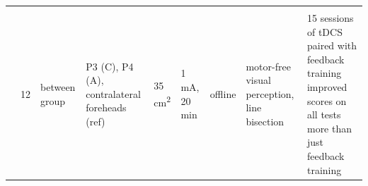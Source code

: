\documentclass[11pt,english,]{memoir}
\begin{document}
\begin{longtable}[]{@{}lllllllll@{}}
\begin{minipage}[t]{0.04\columnwidth}
\strut
\end{minipage} & \begin{minipage}[t]{0.10\columnwidth}\raggedright
\strut
\end{minipage} & \begin{minipage}[t]{0.04\columnwidth}\raggedright
\strut
\end{minipage} & \begin{minipage}[t]{0.04\columnwidth}\raggedright
\strut
\end{minipage} & \begin{minipage}[t]{0.04\columnwidth}\raggedright
\strut
\end{minipage} & \begin{minipage}[t]{0.10\columnwidth}\raggedright
\strut
\end{minipage} & \begin{minipage}[t]{0.28\columnwidth}\raggedright
\strut
\end{minipage}\tabularnewline
\begin{minipage}[t]{0.09\columnwidth}\raggedright
\textcite{Bang2015}\strut
\end{minipage} & \begin{minipage}[t]{0.02\columnwidth}\raggedright
12\strut
\end{minipage} & \begin{minipage}[t]{0.04\columnwidth}\raggedright
between
group\strut
\end{minipage} & \begin{minipage}[t]{0.10\columnwidth}\raggedright
P3 (C), P4 (A),
contralateral
foreheads (ref)\strut
\end{minipage} & \begin{minipage}[t]{0.04\columnwidth}\raggedright
35
cm\textsuperscript{2}\strut
\end{minipage} & \begin{minipage}[t]{0.04\columnwidth}\raggedright
1 mA,
20 min\strut
\end{minipage} & \begin{minipage}[t]{0.04\columnwidth}\raggedright
offline\strut
\end{minipage} & \begin{minipage}[t]{0.10\columnwidth}\raggedright
motor-free visual
perception, line
bisection\strut
\end{minipage} & \begin{minipage}[t]{0.28\columnwidth}\raggedright
15 sessions of tDCS paired with feedback training improved
scores on all tests more than just feedback training\strut

\end{minipage}
\end{longtable}
\end{document}
